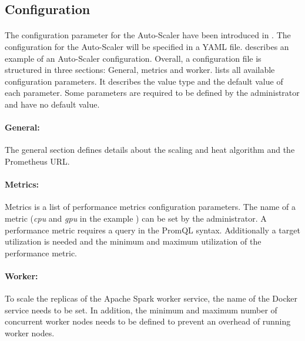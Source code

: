 %
%


\subsection{Configuration}
\paragraph{}The configuration parameter for the Auto-Scaler have been introduced in .
The configuration for the Auto-Scaler will be specified in a YAML file.
 describes an example of an Auto-Scaler configuration.
Overall, a configuration file is structured in three sections: General, metrics and worker.
 lists all available configuration parameters. It describes the value type and the default value of each parameter. Some parameters are required to be defined by the administrator and have no default value.

\paragraph{General:}
The general section defines details about the scaling and heat algorithm and the Prometheus URL.


\paragraph{Metrics:}
Metrics is a list of performance metrics configuration parameters. The name of a metric (\textit{cpu} and \textit{gpu} in the example ) can be set by the administrator. A performance metric requires a query in the PromQL syntax. Additionally a target utilization is needed and the minimum and maximum utilization of the performance metric.


\paragraph{Worker:}
To scale the replicas of the Apache Spark worker service, the name of the Docker service needs to be set. In addition, the minimum and maximum number of concurrent worker nodes needs to be defined to prevent an overhead of running worker nodes.


